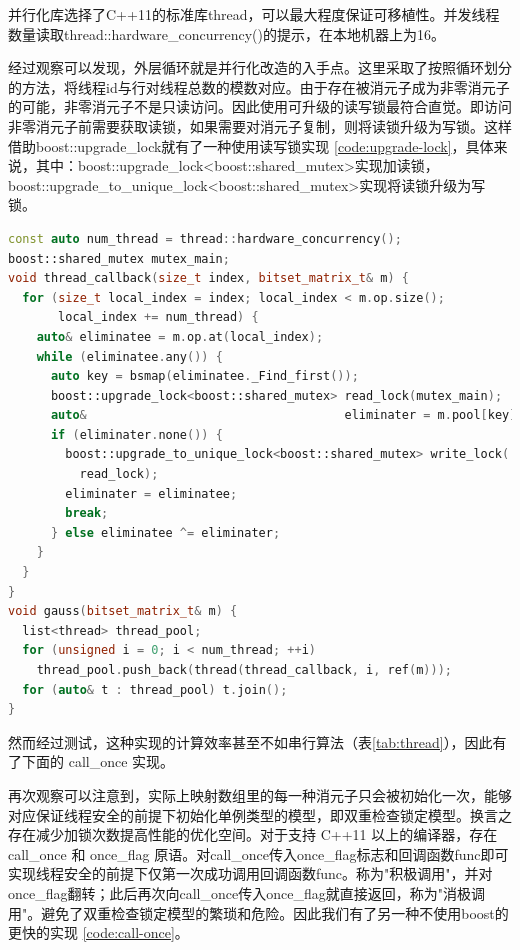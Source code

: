 \documentclass[a4paper]{article}
\begin{document}
并行化库选择了C++11的标准库thread，可以最大程度保证可移植性。并发线程数量读取thread::hardware\_concurrency()的提示，在本地机器上为16。

经过观察可以发现，外层循环就是并行化改造的入手点。这里采取了按照循环划分的方法，将线程id与行对线程总数的模数对应。由于存在被消元子成为非零消元子的可能，非零消元子不是只读访问。因此使用可升级的读写锁最符合直觉。即访问非零消元子前需要获取读锁，如果需要对消元子复制，则将读锁升级为写锁。这样借助boost::upgrade\_lock就有了一种使用读写锁实现 \ref{code:upgrade-lock}，具体来说，其中：boost::upgrade\_lock<boost::shared\_mutex>实现加读锁，boost::upgrade\_to\_unique\_lock<boost::shared\_mutex>实现将读锁升级为写锁。

\begin{lstlisting}[frame=trbl, language={C++}, caption={upgrade\_lock 位元矩阵消元部分}, label={code:upgrade-lock}]
const auto num_thread = thread::hardware_concurrency();
boost::shared_mutex mutex_main;
void thread_callback(size_t index, bitset_matrix_t& m) {
  for (size_t local_index = index; local_index < m.op.size();
       local_index += num_thread) {
    auto& eliminatee = m.op.at(local_index);
    while (eliminatee.any()) {
      auto key = bsmap(eliminatee._Find_first());
      boost::upgrade_lock<boost::shared_mutex> read_lock(mutex_main);
      auto&                                    eliminater = m.pool[key];
      if (eliminater.none()) {
        boost::upgrade_to_unique_lock<boost::shared_mutex> write_lock(
          read_lock);
        eliminater = eliminatee;
        break;
      } else eliminatee ^= eliminater;
    }
  }
}
void gauss(bitset_matrix_t& m) {
  list<thread> thread_pool;
  for (unsigned i = 0; i < num_thread; ++i)
    thread_pool.push_back(thread(thread_callback, i, ref(m)));
  for (auto& t : thread_pool) t.join();
}
\end{lstlisting}

然而经过测试，这种实现的计算效率甚至不如串行算法（表\ref{tab:thread}），因此有了下面的 call\_once 实现。

再次观察可以注意到，实际上映射数组里的每一种消元子只会被初始化一次，能够对应保证线程安全的前提下初始化单例类型的模型，即双重检查锁定模型。换言之存在减少加锁次数提高性能的优化空间。对于支持 C++11 以上的编译器，存在 call\_once 和 once\_flag 原语。对call\_once传入once\_flag标志和回调函数func即可实现线程安全的前提下仅第一次成功调用回调函数func。称为"积极调用"，并对once\_flag翻转；此后再次向call\_once传入once\_flag就直接返回，称为"消极调用"。避免了双重检查锁定模型的繁琐和危险。因此我们有了另一种不使用boost的更快的实现 \ref{code:call-once}。
\end{document}
